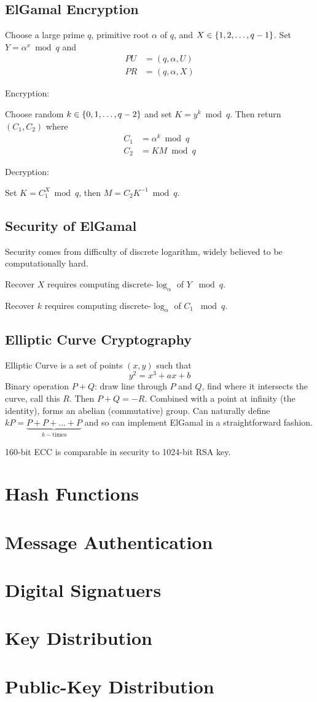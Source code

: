 \documentclass[draft]{article}
\begin{document}
\begin{multicols}{2}
    \subsection{ElGamal Encryption}
    Choose a large prime $q$, primitive root $\alpha$ of $q$, and $X \in \left\lbrace1, 2, \hdots, q - 1\right\rbrace$. Set $Y = \alpha^x\bmod{q}$ and \begin{align*}PU&=(q,\alpha,U)\\PR&=(q,\alpha,X)\end{align*}

    Encryption:

    Choose random $k\in\left\lbrace0,1,\hdots, q-2\right\rbrace$ and set $K=y^k\bmod{q}$. Then return $(C_1, C_2)$ where \begin{align*}C_1&=\alpha^k\bmod{q}\\C_2&=KM\bmod{q}\end{align*}

    Decryption:

    Set $K=C_1^X\bmod{q}$, then $M = C_2K^{-1}\bmod{q}$.

    \subsection{Security of ElGamal}
    Security comes from difficulty of discrete logarithm, widely believed to be computationally hard.

    Recover $X$ requires computing discrete-$\log_{\alpha}$ of $Y$ $\bmod{q}$.

    Recover $k$ requires computing discrete-$\log_{\alpha}$ of $C_1$ $\bmod{q}$.
    \subsection{Elliptic Curve Cryptography}
    Elliptic Curve is a set of points $(x,y)$ such that \[y^2=x^3+ax+b\] Binary operation $P + Q$: draw line through $P$ and $Q$, find where it intersects the curve, call this $R$. Then $P+Q = -R$. Combined with a point at infinity (the identity), forms an abelian (commutative) group. Can naturally define $kP = \underbrace{P + P + \dots + P}_{k-\text{times}}$ and so can implement ElGamal in a straightforward fashion.

    160-bit ECC is comparable in security to 1024-bit RSA key.
\end{multicols}
\section{Hash Functions}
\section{Message Authentication}
\section{Digital Signatuers}
\section{Key Distribution}
\section{Public-Key Distribution}
\clearpage

\glsaddall
\printglossary[nonumberlist]
\printglossary[nonumberlist,type=\acronymtype]
\end{document}
